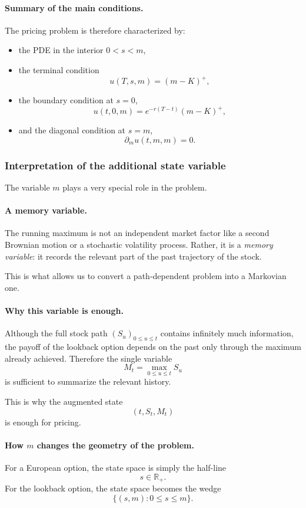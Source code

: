 \documentclass[11pt]{article}
\newcommand{\R}{\mathbb{R}}
\theoremstyle{plain}
\theoremstyle{definition}
\theoremstyle{remark}
\begin{document}
\paragraph{Summary of the main conditions.}
The pricing problem is therefore characterized by:
\begin{itemize}[leftmargin=1.4em]
    \item the PDE in the interior \(0<s<m\),
    \item the terminal condition
    \[
    u(T,s,m)=(m-K)^+,
    \]
    \item the boundary condition at \(s=0\),
    \[
    u(t,0,m)=e^{-r(T-t)}(m-K)^+,
    \]
    \item and the diagonal condition at \(s=m\),
    \[
    \partial_m u(t,m,m)=0.
    \]
\end{itemize}

\subsubsection{Interpretation of the additional state variable}

The variable \(m\) plays a very special role in the problem.

\paragraph{A memory variable.}
The running maximum is not an independent market factor like a second
Brownian motion or a stochastic volatility process.
Rather, it is a \emph{memory variable}: it records the relevant part of
the past trajectory of the stock.

This is what allows us to convert a path-dependent problem into a
Markovian one.

\paragraph{Why this variable is enough.}
Although the full stock path \((S_u)_{0\le u\le t}\) contains infinitely
much information, the payoff of the lookback option depends on the past
only through the maximum already achieved.
Therefore the single variable
\[
M_t=\max_{0\le u\le t}S_u
\]
is sufficient to summarize the relevant history.

This is why the augmented state
\[
(t,S_t,M_t)
\]
is enough for pricing.

\paragraph{How \(m\) changes the geometry of the problem.}
For a European option, the state space is simply the half-line
\[
s\in \R_+.
\]
For the lookback option, the state space becomes the wedge
\[
\{(s,m): 0\le s\le m\}.
\]
\end{document}
